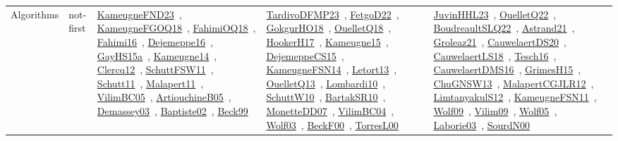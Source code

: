 {\begin{longtable}{lp{3cm}>{\raggedright\arraybackslash}p{6cm}>{\raggedright\arraybackslash}p{6cm}>{\raggedright\arraybackslash}p{8cm}}
Algorithms & not-first & \href{works/KameugneFND23.pdf}{KameugneFND23}~\cite{KameugneFND23}, \href{works/KameugneFGOQ18.pdf}{KameugneFGOQ18}~\cite{KameugneFGOQ18}, \href{works/FahimiOQ18.pdf}{FahimiOQ18}~\cite{FahimiOQ18}, \href{works/Fahimi16.pdf}{Fahimi16}~\cite{Fahimi16}, \href{works/Dejemeppe16.pdf}{Dejemeppe16}~\cite{Dejemeppe16}, \href{works/GayHS15a.pdf}{GayHS15a}~\cite{GayHS15a}, \href{works/Kameugne14.pdf}{Kameugne14}~\cite{Kameugne14}, \href{works/Clercq12.pdf}{Clercq12}~\cite{Clercq12}, \href{works/SchuttFSW11.pdf}{SchuttFSW11}~\cite{SchuttFSW11}, \href{works/Schutt11.pdf}{Schutt11}~\cite{Schutt11}, \href{works/Malapert11.pdf}{Malapert11}~\cite{Malapert11}, \href{works/VilimBC05.pdf}{VilimBC05}~\cite{VilimBC05}, \href{works/ArtiouchineB05.pdf}{ArtiouchineB05}~\cite{ArtiouchineB05}, \href{works/Demassey03.pdf}{Demassey03}~\cite{Demassey03}, \href{works/Baptiste02.pdf}{Baptiste02}~\cite{Baptiste02}, \href{works/Beck99.pdf}{Beck99}~\cite{Beck99} & \href{works/TardivoDFMP23.pdf}{TardivoDFMP23}~\cite{TardivoDFMP23}, \href{works/FetgoD22.pdf}{FetgoD22}~\cite{FetgoD22}, \href{works/GokgurHO18.pdf}{GokgurHO18}~\cite{GokgurHO18}, \href{works/OuelletQ18.pdf}{OuelletQ18}~\cite{OuelletQ18}, \href{works/HookerH17.pdf}{HookerH17}~\cite{HookerH17}, \href{works/Kameugne15.pdf}{Kameugne15}~\cite{Kameugne15}, \href{works/DejemeppeCS15.pdf}{DejemeppeCS15}~\cite{DejemeppeCS15}, \href{works/KameugneFSN14.pdf}{KameugneFSN14}~\cite{KameugneFSN14}, \href{works/Letort13.pdf}{Letort13}~\cite{Letort13}, \href{works/OuelletQ13.pdf}{OuelletQ13}~\cite{OuelletQ13}, \href{works/Lombardi10.pdf}{Lombardi10}~\cite{Lombardi10}, \href{works/SchuttW10.pdf}{SchuttW10}~\cite{SchuttW10}, \href{works/BartakSR10.pdf}{BartakSR10}~\cite{BartakSR10}, \href{works/MonetteDD07.pdf}{MonetteDD07}~\cite{MonetteDD07}, \href{works/VilimBC04.pdf}{VilimBC04}~\cite{VilimBC04}, \href{works/Wolf03.pdf}{Wolf03}~\cite{Wolf03}, \href{works/BeckF00.pdf}{BeckF00}~\cite{BeckF00}, \href{works/TorresL00.pdf}{TorresL00}~\cite{TorresL00} & \href{works/JuvinHHL23.pdf}{JuvinHHL23}~\cite{JuvinHHL23}, \href{works/OuelletQ22.pdf}{OuelletQ22}~\cite{OuelletQ22}, \href{works/BoudreaultSLQ22.pdf}{BoudreaultSLQ22}~\cite{BoudreaultSLQ22}, \href{works/Astrand21.pdf}{Astrand21}~\cite{Astrand21}, \href{works/Groleaz21.pdf}{Groleaz21}~\cite{Groleaz21}, \href{works/CauwelaertDS20.pdf}{CauwelaertDS20}~\cite{CauwelaertDS20}, \href{works/CauwelaertLS18.pdf}{CauwelaertLS18}~\cite{CauwelaertLS18}, \href{works/Tesch16.pdf}{Tesch16}~\cite{Tesch16}, \href{works/CauwelaertDMS16.pdf}{CauwelaertDMS16}~\cite{CauwelaertDMS16}, \href{works/GrimesH15.pdf}{GrimesH15}~\cite{GrimesH15}, \href{works/ChuGNSW13.pdf}{ChuGNSW13}~\cite{ChuGNSW13}, \href{works/MalapertCGJLR12.pdf}{MalapertCGJLR12}~\cite{MalapertCGJLR12}, \href{works/LimtanyakulS12.pdf}{LimtanyakulS12}~\cite{LimtanyakulS12}, \href{works/KameugneFSN11.pdf}{KameugneFSN11}~\cite{KameugneFSN11}, \href{works/Wolf09.pdf}{Wolf09}~\cite{Wolf09}, \href{works/Vilim09.pdf}{Vilim09}~\cite{Vilim09}, \href{works/Wolf05.pdf}{Wolf05}~\cite{Wolf05}, \href{works/Laborie03.pdf}{Laborie03}~\cite{Laborie03}, \href{works/SourdN00.pdf}{SourdN00}~\cite{SourdN00}\\

\end{longtable}}

